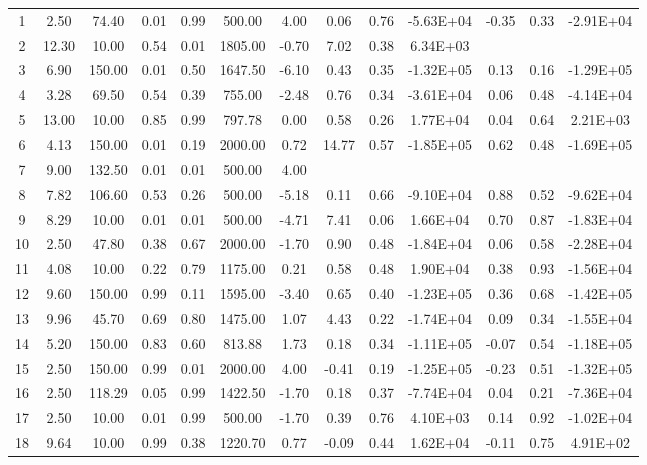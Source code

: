 \begin{landscape}
\begin{center}
\begin{longtable}{|c|c|c|c|c|c|c|c|c|c|c|c|c|}
1   & 2.50  & 74.40  & 0.01 & 0.99 & 500.00  & 4.00  & 0.06  & 0.76 & -5.63E+04 & -0.35 & 0.33 & -2.91E+04 \\
2   & 12.30 & 10.00  & 0.54 & 0.01 & 1805.00 & -0.70 & 7.02  & 0.38 & 6.34E+03  &       &      &           \\
3   & 6.90  & 150.00 & 0.01 & 0.50 & 1647.50 & -6.10 & 0.43  & 0.35 & -1.32E+05 & 0.13  & 0.16 & -1.29E+05 \\
4   & 3.28  & 69.50  & 0.54 & 0.39 & 755.00  & -2.48 & 0.76  & 0.34 & -3.61E+04 & 0.06  & 0.48 & -4.14E+04 \\
5   & 13.00 & 10.00  & 0.85 & 0.99 & 797.78  & 0.00  & 0.58  & 0.26 & 1.77E+04  & 0.04  & 0.64 & 2.21E+03  \\
6   & 4.13  & 150.00 & 0.01 & 0.19 & 2000.00 & 0.72  & 14.77 & 0.57 & -1.85E+05 & 0.62  & 0.48 & -1.69E+05 \\
7   & 9.00  & 132.50 & 0.01 & 0.01 & 500.00  & 4.00  &       &      &           &       &      &           \\
8   & 7.82  & 106.60 & 0.53 & 0.26 & 500.00  & -5.18 & 0.11  & 0.66 & -9.10E+04 & 0.88  & 0.52 & -9.62E+04 \\
9   & 8.29  & 10.00  & 0.01 & 0.01 & 500.00  & -4.71 & 7.41  & 0.06 & 1.66E+04  & 0.70  & 0.87 & -1.83E+04 \\
10  & 2.50  & 47.80  & 0.38 & 0.67 & 2000.00 & -1.70 & 0.90  & 0.48 & -1.84E+04 & 0.06  & 0.58 & -2.28E+04 \\
11  & 4.08  & 10.00  & 0.22 & 0.79 & 1175.00 & 0.21  & 0.58  & 0.48 & 1.90E+04  & 0.38  & 0.93 & -1.56E+04 \\
12  & 9.60  & 150.00 & 0.99 & 0.11 & 1595.00 & -3.40 & 0.65  & 0.40 & -1.23E+05 & 0.36  & 0.68 & -1.42E+05 \\
13  & 9.96  & 45.70  & 0.69 & 0.80 & 1475.00 & 1.07  & 4.43  & 0.22 & -1.74E+04 & 0.09  & 0.34 & -1.55E+04 \\
14  & 5.20  & 150.00 & 0.83 & 0.60 & 813.88  & 1.73  & 0.18  & 0.34 & -1.11E+05 & -0.07 & 0.54 & -1.18E+05 \\
15  & 2.50  & 150.00 & 0.99 & 0.01 & 2000.00 & 4.00  & -0.41 & 0.19 & -1.25E+05 & -0.23 & 0.51 & -1.32E+05 \\
16  & 2.50  & 118.29 & 0.05 & 0.99 & 1422.50 & -1.70 & 0.18  & 0.37 & -7.74E+04 & 0.04  & 0.21 & -7.36E+04 \\
17  & 2.50  & 10.00  & 0.01 & 0.99 & 500.00  & -1.70 & 0.39  & 0.76 & 4.10E+03  & 0.14  & 0.92 & -1.02E+04 \\
18  & 9.64  & 10.00  & 0.99 & 0.38 & 1220.70 & 0.77  & -0.09 & 0.44 & 1.62E+04  & -0.11 & 0.75 & 4.91E+02  \\

\end{longtable}
\end{center}
\end{landscape}
